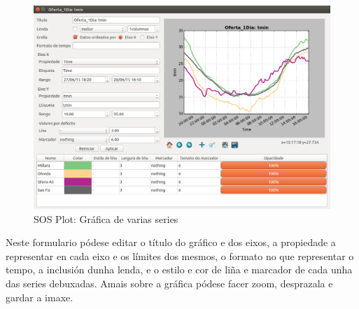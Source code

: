 \begin{figure}[hbtp]
\centering
\includegraphics[width=\textwidth]{images/manual/sosplot.png}
\caption{SOS Plot: Gráfica de varias series}
\label{fig:sosplot}
\end{figure}

Neste formulario pódese editar o título do gráfico e dos eixos, a propiedade a representar en cada eixo e os límites dos mesmos, o formato no que representar o tempo, a inclusión dunha lenda, e o estilo e cor de liña e marcador de cada unha das series debuxadas. Amais sobre a gráfica pódese facer zoom, desprazala e gardar a imaxe.
